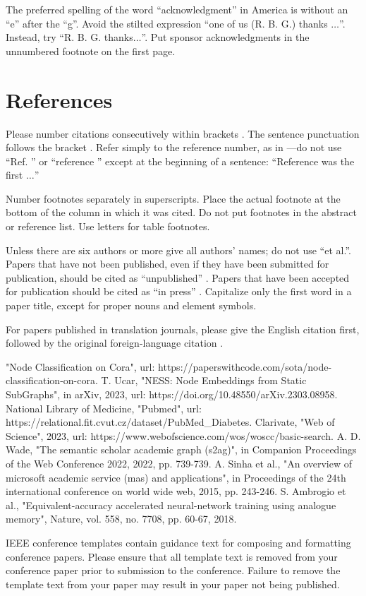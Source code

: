 \documentclass[conference]{IEEEtran}
\begin{document}
The preferred spelling of the word ``acknowledgment'' in America is without 
an ``e'' after the ``g''. Avoid the stilted expression ``one of us (R. B. 
G.) thanks $\ldots$''. Instead, try ``R. B. G. thanks$\ldots$''. Put sponsor 
acknowledgments in the unnumbered footnote on the first page.

\section*{References}

Please number citations consecutively within brackets \cite{b1}. The 
sentence punctuation follows the bracket \cite{b2}. Refer simply to the reference 
number, as in \cite{b3}---do not use ``Ref. \cite{b3}'' or ``reference \cite{b3}'' except at 
the beginning of a sentence: ``Reference \cite{b3} was the first $\ldots$''

Number footnotes separately in superscripts. Place the actual footnote at 
the bottom of the column in which it was cited. Do not put footnotes in the 
abstract or reference list. Use letters for table footnotes.

Unless there are six authors or more give all authors' names; do not use 
``et al.''. Papers that have not been published, even if they have been 
submitted for publication, should be cited as ``unpublished'' \cite{b4}. Papers 
that have been accepted for publication should be cited as ``in press'' \cite{b5}. 
Capitalize only the first word in a paper title, except for proper nouns and 
element symbols.

For papers published in translation journals, please give the English 
citation first, followed by the original foreign-language citation \cite{b6}.

\begin{thebibliography}{00}
 "Node Classification on Cora", url: https://paperswithcode.com/sota/node-classification-on-cora.
 T. Ucar, "NESS: Node Embeddings from Static SubGraphs", in arXiv, 2023, url: https://doi.org/10.48550/arXiv.2303.08958. 
 National Library of Medicine, "Pubmed", url: https://relational.fit.cvut.cz/dataset/PubMed\_Diabetes.
 Clarivate, "Web of Science", 2023, url: https://www.webofscience.com/wos/woscc/basic-search.
 A. D. Wade, "The semantic scholar academic graph (s2ag)", in Companion Proceedings of the Web Conference 2022, 2022, pp. 739-739.
 A. Sinha et al., "An overview of microsoft academic service (mas) and applications", in Proceedings of the 24th international conference on world wide web, 2015, pp. 243-246.
 S. Ambrogio et al., "Equivalent-accuracy accelerated neural-network training using analogue memory", Nature, vol. 558, no. 7708, pp. 60-67, 2018.
\end{thebibliography}
\vspace{12pt}
\color{red}
IEEE conference templates contain guidance text for composing and formatting conference papers. Please ensure that all template text is removed from your conference paper prior to submission to the conference. Failure to remove the template text from your paper may result in your paper not being published.
\end{document}
